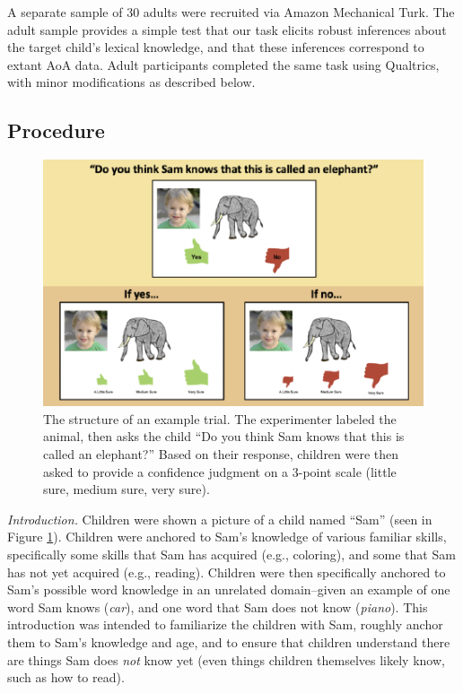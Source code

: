 \documentclass[10pt, letterpaper]{article}
\newenvironment{CodeChunk}{}{}
\begin{document}
A separate sample of 30 adults were recruited via Amazon Mechanical
Turk. The adult sample provides a simple test that our task elicits
robust inferences about the target child's lexical knowledge, and that
these inferences correspond to extant AoA data. Adult participants
completed the same task using Qualtrics, with minor modifications as
described below.

\hypertarget{procedure}{%
\subsection{Procedure}\label{procedure}}

\begin{CodeChunk}
\begin{figure}[tb]

{\centering \includegraphics{figs/task-method-1} 

}

\caption[The structure of an example trial]{The structure of an example trial. The experimenter labeled the animal, then asks the child “Do you think Sam knows that this is called an elephant?” Based on their response, children were then asked to provide a confidence judgment on a 3-point scale (little sure, medium sure, very sure).}\label{fig:task-method}
\end{figure}
\end{CodeChunk}

\emph{Introduction.} Children were shown a picture of a child named
``Sam'' (seen in Figure \ref{fig:task-method}). Children were anchored
to Sam's knowledge of various familiar skills, specifically some skills
that Sam has acquired (e.g., coloring), and some that Sam has not yet
acquired (e.g., reading). Children were then specifically anchored to
Sam's possible word knowledge in an unrelated domain--given an example
of one word Sam knows (\emph{car}), and one word that Sam does not know
(\emph{piano}). This introduction was intended to familiarize the
children with Sam, roughly anchor them to Sam's knowledge and age, and
to ensure that children understand there are things Sam does \emph{not}
know yet (even things children themselves likely know, such as how to
read).
\end{document}
